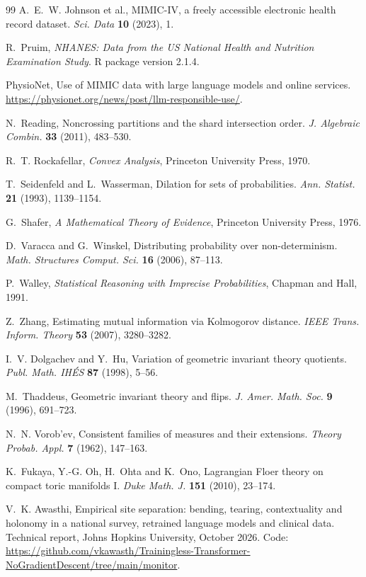 \documentclass[11pt]{article}
\theoremstyle{definition}
\theoremstyle{remark}
\begin{document}
\begin{thebibliography}{99}
A.~E.~W. Johnson et al., {MIMIC-IV}, a freely accessible electronic health record dataset. \emph{Sci. Data} \textbf{10} (2023), 1.

R.~Pruim, \emph{NHANES: Data from the US National Health and Nutrition Examination Study}. R package version 2.1.4.

PhysioNet, Use of {MIMIC} data with large language models and online services.
\url{https://physionet.org/news/post/llm-responsible-use/}.

N.~Reading, Noncrossing partitions and the shard intersection order. \emph{J. Algebraic Combin.} \textbf{33} (2011), 483--530.

R.~T. Rockafellar, \emph{Convex Analysis}, Princeton University Press, 1970.

T.~Seidenfeld and L.~Wasserman, Dilation for sets of probabilities. \emph{Ann. Statist.} \textbf{21} (1993), 1139--1154.

G.~Shafer, \emph{A Mathematical Theory of Evidence}, Princeton University Press, 1976.

D.~Varacca and G.~Winskel, Distributing probability over non-determinism. \emph{Math. Structures Comput. Sci.} \textbf{16} (2006), 87--113.

P.~Walley, \emph{Statistical Reasoning with Imprecise Probabilities}, Chapman and Hall, 1991.

Z.~Zhang, Estimating mutual information via {K}olmogorov distance. \emph{IEEE Trans. Inform. Theory} \textbf{53} (2007), 3280--3282.

I.~V. Dolgachev and Y.~Hu, Variation of geometric invariant theory quotients. \emph{Publ. Math. IH\'ES} \textbf{87} (1998), 5--56.

M.~Thaddeus, Geometric invariant theory and flips. \emph{J. Amer. Math. Soc.} \textbf{9} (1996), 691--723.

N.~N. Vorob'ev, Consistent families of measures and their extensions. \emph{Theory Probab. Appl.} \textbf{7} (1962), 147--163.

K.~Fukaya, Y.-G. Oh, H.~Ohta and K.~Ono, Lagrangian Floer theory on compact toric manifolds {I}. \emph{Duke Math. J.} \textbf{151}
(2010), 23--174.

V.~K. Awasthi, Empirical site separation: bending, tearing, contextuality and holonomy in a national survey, retrained language models and
clinical data. Technical report, Johns Hopkins University, October 2026. Code: \url{https://github.com/vkawasth/Trainingless-Transformer-NoGradientDescent/tree/main/monitor}.

\end{thebibliography}
\end{document}
